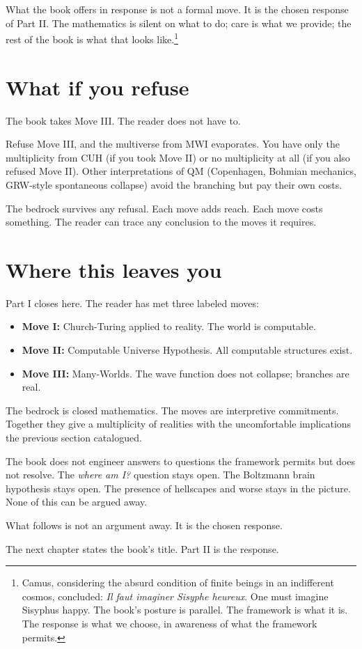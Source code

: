 What the book offers in response is not a formal move. It is the chosen response of Part II. The mathematics is silent on what to do; care is what we provide; the rest of the book is what that looks like.\footnote{Camus, considering the absurd condition of finite beings in an indifferent cosmos, concluded: \emph{Il faut imaginer Sisyphe heureux}. One must imagine Sisyphus happy. The book's posture is parallel. The framework is what it is. The response is what we choose, in awareness of what the framework permits.}

\section*{What if you refuse}

The book takes Move III. The reader does not have to.

Refuse Move III, and the multiverse from MWI evaporates. You have only the multiplicity from CUH (if you took Move II) or no multiplicity at all (if you also refused Move II). Other interpretations of QM (Copenhagen, Bohmian mechanics, GRW-style spontaneous collapse) avoid the branching but pay their own costs.

The bedrock survives any refusal. Each move adds reach. Each move costs something. The reader can trace any conclusion to the moves it requires.

\section*{Where this leaves you}

Part I closes here. The reader has met three labeled moves:

\begin{itemize}
\item \textbf{Move I:} Church-Turing applied to reality. The world is computable.
\item \textbf{Move II:} Computable Universe Hypothesis. All computable structures exist.
\item \textbf{Move III:} Many-Worlds. The wave function does not collapse; branches are real.
\end{itemize}

The bedrock is closed mathematics. The moves are interpretive commitments. Together they give a multiplicity of realities with the uncomfortable implications the previous section catalogued.

The book does not engineer answers to questions the framework permits but does not resolve. The \emph{where am I?} question stays open. The Boltzmann brain hypothesis stays open. The presence of hellscapes and worse stays in the picture. None of this can be argued away.

What follows is not an argument away. It is the chosen response.

The next chapter states the book's title. Part II is the response.
